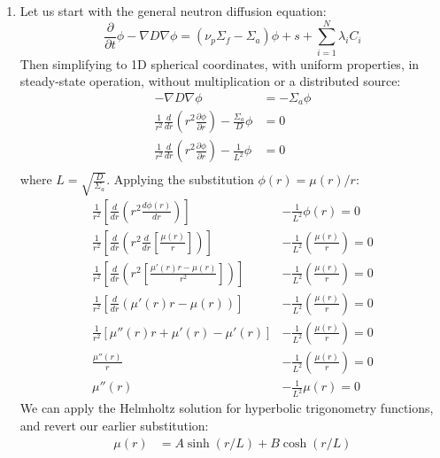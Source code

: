 \documentclass[11pt]{article}
\newcommand{\beq}{\begin{equation}\begin{aligned}}
\newcommand{\eeq}{\end{aligned}\end{equation}}
\newcommand{\ans}[1]{{\color{violet}#1}}
\newcommand{\ddt}{\frac{\partial}{\partial t}}
\begin{document}
\begin{enumerate}
\beq
\label{eq:phi1}
\phi(r)=\frac{S}{4\pi D\sinh{\frac{\tilde{R}}{L}}}\frac{\sinh{\frac{\tilde{R}-r}{L}}}{r}
\eeq
\item[] \ans{
    Let us start with the general neutron diffusion equation:
    \begin{equation}
        \ddt\phi-\nabla D\nabla\phi = (\nu_p\Sigma_f - \Sigma_a)\phi + s + \sum_{i=1}^{N}\lambda_iC_i
    \end{equation}
    Then simplifying to 1D spherical coordinates, with uniform properties, in steady-state operation, without multiplication or a distributed source:
    \begin{align*}
    -\nabla D\nabla\phi &= - \Sigma_a\phi\\
    \frac{1}{r^2}\frac{d}{dr}\left(r^2 \frac{\partial\phi}{\partial r}\right) - \frac{\Sigma_a}{D}\phi&=0\\
    \frac{1}{r^2}\frac{d}{dr}\left(r^2 \frac{\partial\phi}{\partial r}\right) - \frac{1}{L^2}\phi&=0\\
    \end{align*}
    where $L=\sqrt{\frac{D}{\Sigma_a}}$.
    Applying the substitution $\phi(r)=\mu(r)/r$:
    \begin{align*}
        \frac{1}{r^2}\left\lbrack \frac{d}{dr}\left(r^2\frac{d\phi(r)}{dr}\right) \right\rbrack &-\frac{1}{L^2}\phi(r)=0 \\  
        \frac{1}{r^2}\left\lbrack \frac{d}{dr}\left(r^2\frac{d}{dr}\left[\frac{\mu(r)}{r}\right]\right) \right\rbrack &-\frac{1}{L^2}\left(\frac{\mu(r)}{r}\right)=0 \\
        \frac{1}{r^2}\left\lbrack \frac{d}{dr}\left(r^2\left[\frac{\mu'(r)r - \mu(r)}{r^2}\right]\right) \right\rbrack &-\frac{1}{L^2}\left(\frac{\mu(r)}{r}\right)=0 \\
        \frac{1}{r^2}\left\lbrack \frac{d}{dr}\left(\mu'(r)r - \mu(r)\right) \right\rbrack &-\frac{1}{L^2}\left(\frac{\mu(r)}{r}\right)=0 \\
        \frac{1}{r^2}\left\lbrack \mu''(r)r + \mu'(r) - \mu'(r) \right\rbrack &-\frac{1}{L^2}\left(\frac{\mu(r)}{r}\right)=0 \\
        \frac{\mu''(r)}{r} &-\frac{1}{L^2}\left(\frac{\mu(r)}{r}\right)=0 \\
        \mu''(r) &-\frac{1}{L^2}\mu(r) = 0
    \end{align*}
    We can apply the Helmholtz solution for hyperbolic trigonometry functions, and revert our earlier substitution:
    \begin{align*}
        \mu(r)&=A\sinh(r/L)+B\cosh(r/L)\\

\end{align*}}
\end{enumerate}
\end{document}
